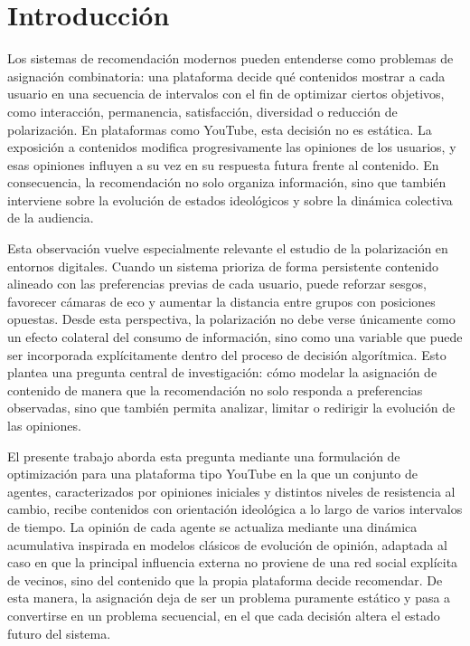 \documentclass[10pt,letterpaper]{article}
\begin{document}
\section{Introducci\'on}

Los sistemas de recomendaci\'on modernos pueden entenderse como problemas de asignaci\'on combinatoria: una plataforma decide qu\'e contenidos mostrar a cada usuario en una secuencia de intervalos con el fin de optimizar ciertos objetivos, como interacci\'on, permanencia, satisfacci\'on, diversidad o reducci\'on de polarizaci\'on. En plataformas como YouTube, esta decisi\'on no es est\'atica. La exposici\'on a contenidos modifica progresivamente las opiniones de los usuarios, y esas opiniones influyen a su vez en su respuesta futura frente al contenido. En consecuencia, la recomendaci\'on no solo organiza informaci\'on, sino que tambi\'en interviene sobre la evoluci\'on de estados ideol\'ogicos y sobre la din\'amica colectiva de la audiencia.

Esta observaci\'on vuelve especialmente relevante el estudio de la polarizaci\'on en entornos digitales. Cuando un sistema prioriza de forma persistente contenido alineado con las preferencias previas de cada usuario, puede reforzar sesgos, favorecer c\'amaras de eco y aumentar la distancia entre grupos con posiciones opuestas. Desde esta perspectiva, la polarizaci\'on no debe verse \'unicamente como un efecto colateral del consumo de informaci\'on, sino como una variable que puede ser incorporada expl\'icitamente dentro del proceso de decisi\'on algor\'itmica. Esto plantea una pregunta central de investigaci\'on: c\'omo modelar la asignaci\'on de contenido de manera que la recomendaci\'on no solo responda a preferencias observadas, sino que tambi\'en permita analizar, limitar o redirigir la evoluci\'on de las opiniones.

El presente trabajo aborda esta pregunta mediante una formulaci\'on de optimizaci\'on para una plataforma tipo YouTube en la que un conjunto de agentes, caracterizados por opiniones iniciales y distintos niveles de resistencia al cambio, recibe contenidos con orientaci\'on ideol\'ogica a lo largo de varios intervalos de tiempo. La opini\'on de cada agente se actualiza mediante una din\'amica acumulativa inspirada en modelos cl\'asicos de evoluci\'on de opini\'on, adaptada al caso en que la principal influencia externa no proviene de una red social expl\'icita de vecinos, sino del contenido que la propia plataforma decide recomendar. De esta manera, la asignaci\'on deja de ser un problema puramente est\'atico y pasa a convertirse en un problema secuencial, en el que cada decisi\'on altera el estado futuro del sistema.
\end{document}
